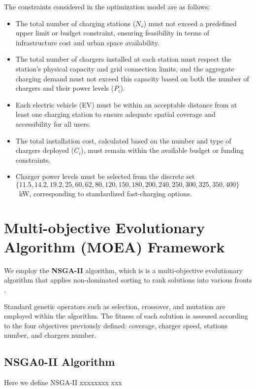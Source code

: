 The constraints considered in the optimization model are as follows:
\begin{itemize}
    \item The total number of charging stations ($N_s$) must not exceed a predefined upper limit or budget constraint, ensuring feasibility in terms of infrastructure cost and urban space availability.

    \item The total number of chargers installed at each station must respect the station's physical capacity and grid connection limits, and the aggregate charging demand must not exceed this capacity based on both the number of chargers and their power levels ($P_i$).

    \item Each electric vehicle (EV) must be within an acceptable distance from at least one charging station to ensure adequate spatial coverage and accessibility for all users.

    \item The total installation cost, calculated based on the number and type of chargers deployed ($C_i$), must remain within the available budget or funding constraints.

    \item Charger power levels must be selected from the discrete set $\{11.5, 14.2, 19.2, 25, 60, 62, 80, 120, 150, 180, 200, 240, 250, 300, 325, 350, 400\}$~kW, corresponding to standardized fast-charging options.
\end{itemize}



\section{Multi-objective Evolutionary Algorithm (MOEA) Framework}
We employ the \textbf{NSGA-II} algorithm, which is  is a multi-objective evolutionary algorithm that applies non-dominated sorting to rank solutions into various fronts \cite{A Fast and Elitist Multi-objective Genetic Algorithm: NSGA-II}.

Standard genetic operators such as selection, crossover, and mutation are employed within the algorithm. The fitness of each solution is assessed according to the four objectives previously defined: coverage, charger speed, stations number, and chargers number.

\subsection{NSGA0-II Algorithm}

Here we define NSGA-II
xxxxxxxx
xxx




